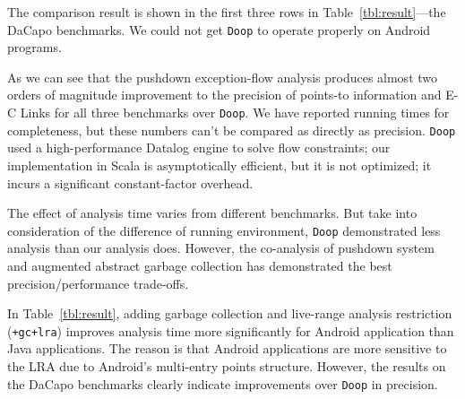 The comparison result is shown in the first three rows in Table~\ref{tbl:result}---the DaCapo benchmarks.
We could not get {\tt{Doop}} to operate properly on Android programs.


As we can see that
the pushdown exception-flow analysis produces 
almost two orders of magnitude improvement to the precision of points-to information 
and E-C Links for all three benchmarks over {\tt{Doop}}.
We have reported running times for completeness, but 
these numbers can't be compared as directly as precision.
\texttt{Doop} used a high-performance Datalog engine to solve
flow constraints; our implementation in Scala is asymptotically efficient,
but it is not optimized; it incurs a significant constant-factor overhead.


The effect of analysis time varies from different benchmarks.
But take into consideration of the difference of running environment,
{\tt{Doop}} demonstrated less analysis than our analysis does.
However, the co-analysis of pushdown system and augmented abstract garbage collection 
has demonstrated the best precision/performance trade-offs.

In Table~\ref{tbl:result}, 
adding garbage collection and live-range analysis restriction ({\tt{+gc+lra}}) 
improves analysis time  more significantly for Android application than Java applications.
The reason is that Android applications are more sensitive to the LRA due to Android's multi-entry points structure.
However, the results on the DaCapo benchmarks clearly indicate improvements over \texttt{Doop} in precision.


